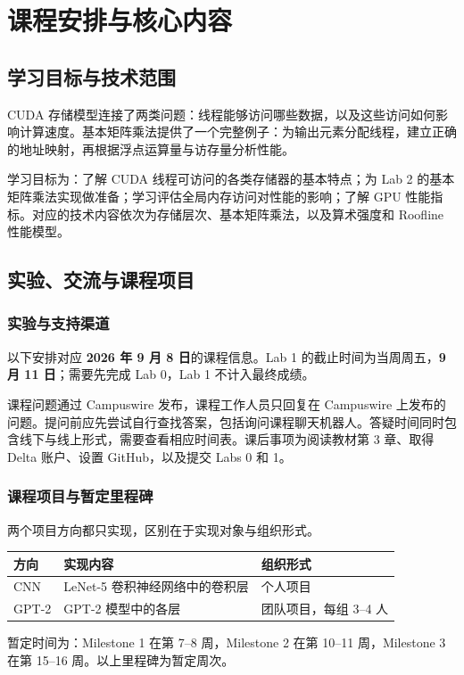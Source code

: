 \section{课程安排与核心内容}

\subsection{学习目标与技术范围}
CUDA 存储模型连接了两类问题：线程能够访问哪些数据，以及这些访问如何影响计算速度。基本矩阵乘法提供了一个完整例子：为输出元素分配线程，建立正确的地址映射，再根据浮点运算量与访存量分析性能。

学习目标为：了解 CUDA 线程可访问的各类存储器的基本特点；为 Lab 2 的基本矩阵乘法实现做准备；学习评估全局内存访问对性能的影响；了解 GPU 性能指标。对应的技术内容依次为存储层次、基本矩阵乘法，以及算术强度和 Roofline 性能模型。

\subsection{实验、交流与课程项目}
\subsubsection{实验与支持渠道}
以下安排对应 \textbf{2026 年 9 月 8 日}的课程信息。Lab 1 的截止时间为当周周五，\textbf{9 月 11 日}；需要先完成 Lab 0，Lab 1 不计入最终成绩。

课程问题通过 Campuswire 发布，课程工作人员只回复在 Campuswire 上发布的问题。提问前应先尝试自行查找答案，包括询问课程聊天机器人。答疑时间同时包含线下与线上形式，需要查看相应时间表。课后事项为阅读教材第 3 章、取得 Delta 账户、设置 GitHub，以及提交 Labs 0 和 1。

\subsubsection{课程项目与暂定里程碑}
两个项目方向都只实现，区别在于实现对象与组织形式。
\begin{table}[H]
\centering\small
\begin{tabularx}{\textwidth}{L{0.12\textwidth} Y L{0.25\textwidth}}
\toprule
方向 & 实现内容 & 组织形式 \\
\midrule
CNN & LeNet-5 卷积神经网络中的卷积层 & 个人项目 \\
GPT-2 & GPT-2 模型中的各层 & 团队项目，每组 3--4 人 \\
\bottomrule
\end{tabularx}
\end{table}
\noindent 暂定时间为：Milestone 1 在第 7--8 周，Milestone 2 在第 10--11 周，Milestone 3 在第 15--16 周。以上里程碑为暂定周次。
